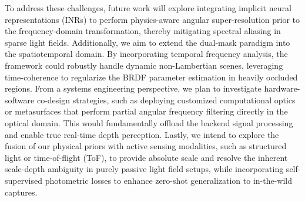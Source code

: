 \documentclass[journal]{IEEEtran}
\begin{document}
To address these challenges, future work will explore integrating implicit neural representations (INRs) to perform physics-aware angular super-resolution prior to the frequency-domain transformation, thereby mitigating spectral aliasing in sparse light fields. Additionally, we aim to extend the dual-mask paradigm into the spatiotemporal domain. By incorporating temporal frequency analysis, the framework could robustly handle dynamic non-Lambertian scenes, leveraging time-coherence to regularize the BRDF parameter estimation in heavily occluded regions. From a systems engineering perspective, we plan to investigate hardware-software co-design strategies, such as deploying customized computational optics or metasurfaces that perform partial angular frequency filtering directly in the optical domain. This would fundamentally offload the backend signal processing and enable true real-time depth perception. Lastly, we intend to explore the fusion of our physical priors with active sensing modalities, such as structured light or time-of-flight (ToF), to provide absolute scale and resolve the inherent scale-depth ambiguity in purely passive light field setups, while incorporating self-supervised photometric losses to enhance zero-shot generalization to in-the-wild captures.



\end{document}
